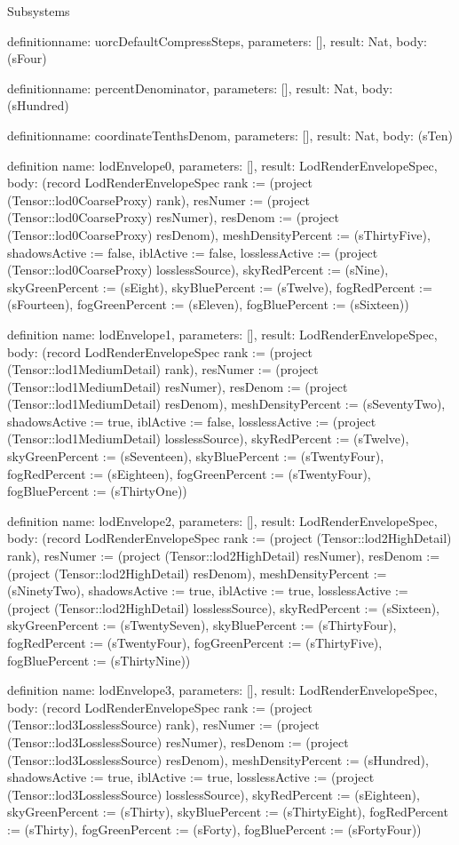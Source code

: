 \begin{lexlean}{Subsystems}
\begin{semanticmodule}
definition{name: uorcDefaultCompressSteps, parameters: [], result: Nat, body: (sFour)}

definition{name: percentDenominator, parameters: [], result: Nat, body: (sHundred)}

definition{name: coordinateTenthsDenom, parameters: [], result: Nat, body: (sTen)}

definition{
  name: lodEnvelope0,
  parameters: [],
  result: LodRenderEnvelopeSpec,
  body: (record LodRenderEnvelopeSpec {rank := (project (Tensor::lod0CoarseProxy) rank), resNumer := (project (Tensor::lod0CoarseProxy) resNumer), resDenom := (project (Tensor::lod0CoarseProxy) resDenom), meshDensityPercent := (sThirtyFive), shadowsActive := false, iblActive := false, losslessActive := (project (Tensor::lod0CoarseProxy) losslessSource), skyRedPercent := (sNine), skyGreenPercent := (sEight), skyBluePercent := (sTwelve), fogRedPercent := (sFourteen), fogGreenPercent := (sEleven), fogBluePercent := (sSixteen)})
}

definition{
  name: lodEnvelope1,
  parameters: [],
  result: LodRenderEnvelopeSpec,
  body: (record LodRenderEnvelopeSpec {rank := (project (Tensor::lod1MediumDetail) rank), resNumer := (project (Tensor::lod1MediumDetail) resNumer), resDenom := (project (Tensor::lod1MediumDetail) resDenom), meshDensityPercent := (sSeventyTwo), shadowsActive := true, iblActive := false, losslessActive := (project (Tensor::lod1MediumDetail) losslessSource), skyRedPercent := (sTwelve), skyGreenPercent := (sSeventeen), skyBluePercent := (sTwentyFour), fogRedPercent := (sEighteen), fogGreenPercent := (sTwentyFour), fogBluePercent := (sThirtyOne)})
}

definition{
  name: lodEnvelope2,
  parameters: [],
  result: LodRenderEnvelopeSpec,
  body: (record LodRenderEnvelopeSpec {rank := (project (Tensor::lod2HighDetail) rank), resNumer := (project (Tensor::lod2HighDetail) resNumer), resDenom := (project (Tensor::lod2HighDetail) resDenom), meshDensityPercent := (sNinetyTwo), shadowsActive := true, iblActive := true, losslessActive := (project (Tensor::lod2HighDetail) losslessSource), skyRedPercent := (sSixteen), skyGreenPercent := (sTwentySeven), skyBluePercent := (sThirtyFour), fogRedPercent := (sTwentyFour), fogGreenPercent := (sThirtyFive), fogBluePercent := (sThirtyNine)})
}

definition{
  name: lodEnvelope3,
  parameters: [],
  result: LodRenderEnvelopeSpec,
  body: (record LodRenderEnvelopeSpec {rank := (project (Tensor::lod3LosslessSource) rank), resNumer := (project (Tensor::lod3LosslessSource) resNumer), resDenom := (project (Tensor::lod3LosslessSource) resDenom), meshDensityPercent := (sHundred), shadowsActive := true, iblActive := true, losslessActive := (project (Tensor::lod3LosslessSource) losslessSource), skyRedPercent := (sEighteen), skyGreenPercent := (sThirty), skyBluePercent := (sThirtyEight), fogRedPercent := (sThirty), fogGreenPercent := (sForty), fogBluePercent := (sFortyFour)})
}


\end{semanticmodule}
\end{lexlean}
